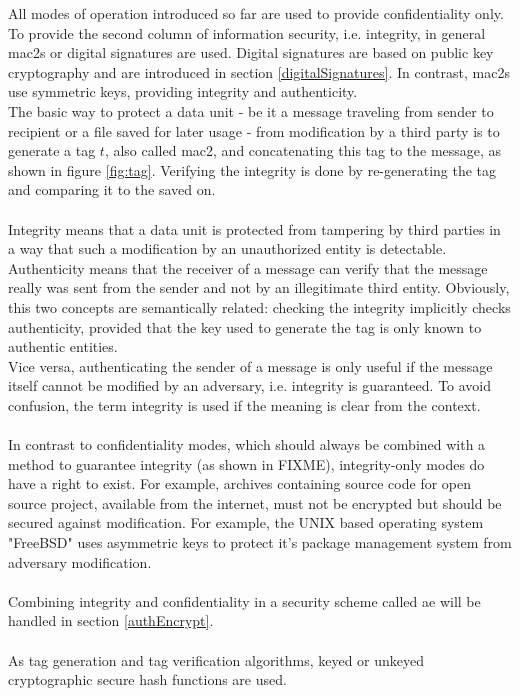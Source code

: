 All modes of operation introduced so far are used to provide confidentiality only. To provide the second column of information security, i.e. integrity, in general
\glspl{mac2} or digital signatures are used.
Digital signatures are based on public key cryptography and are introduced in section \ref{digitalSignatures}. In contrast, \glspl{mac2} use symmetric keys,
providing integrity and authenticity. 
\\
The basic way to protect a data unit - be it a message traveling from sender to recipient or a file saved for later usage - from modification by a third party is to
generate a tag $t$, also called \gls{mac2}, and concatenating this tag to the message, as shown in figure \ref{fig:tag}.
Verifying the integrity is done by re-generating the tag and comparing it to the saved on. 
\\
\\
Integrity means that a data unit is 
protected from tampering by third parties in a way that such a modification by an unauthorized entity is detectable. Authenticity means that the receiver of
a message can verify that the message really was sent from the sender and not by an illegitimate third entity. Obviously, this two concepts are semantically
related: checking the integrity implicitly checks authenticity, provided that the key used to generate the tag is only known to authentic entities.
\\
Vice versa, authenticating the sender of a message is only useful if the message itself cannot be modified by an adversary, i.e. integrity is guaranteed. To
avoid confusion, the term integrity is used if the meaning is clear from the context.
\\
\\
In contrast to confidentiality modes, which should always be combined with a method to guarantee integrity (as shown in FIXME), 
integrity-only modes do have a right to exist. For example, archives containing source code for open source project, available from the internet, must not be
encrypted but should be secured against modification. For example, the UNIX based operating system "FreeBSD" uses asymmetric keys to protect it's package
management system from adversary modification.
\\
\\
Combining integrity and confidentiality in a security scheme called \gls{ae} will be handled in section \ref{authEncrypt}.
\\
\\
As tag generation and tag verification algorithms, keyed or unkeyed cryptographic secure hash functions are used.

